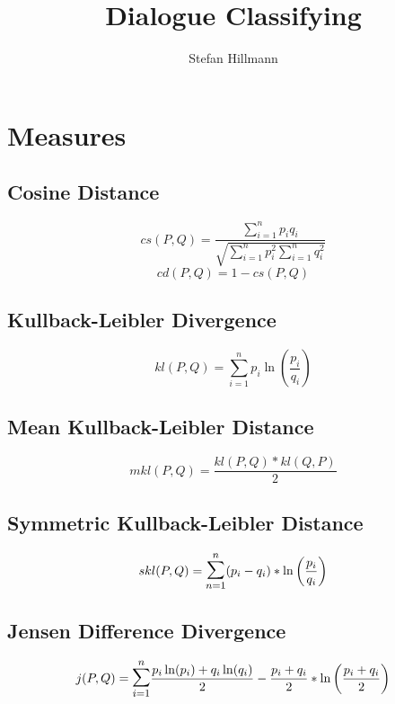 \documentclass[10pt,a4paper]{article}
\author{Stefan Hillmann}
\title{Dialogue Classifying}
\begin{document}
\maketitle

\section{Measures}
\subsection{Cosine Distance}
\begin{equation}
  cs(P,Q)=\frac{ \sum\limits_{i=1}^n p_i q_i }{ \sqrt{ \sum\limits_{i=1}^n p_i^2 \sum\limits_{i=1}^n q_i^2 } }
\end{equation}
\begin{equation}
  cd(P,Q) = 1-cs(P,Q)
\end{equation}

\subsection{Kullback-Leibler Divergence}
\begin{equation}
  kl(P, Q) = \sum\limits_{i=1}^n p_i \ln\left(\frac{p_i}{q_i}\right)
\end{equation}

\subsection{Mean Kullback-Leibler Distance}
\begin{equation}
  mkl(P, Q) = \frac{kl(P,Q)*kl(Q,P)}{2}
\end{equation}

\subsection{Symmetric Kullback-Leibler Distance}
\begin{equation}
  skl(P,Q) = \mathlarger{\mathlarger{\sum}}\limits_{n=1}^n (p_i-q_i) * \ln \left(\frac{p_i}{q_i}\right)
\end{equation}
\subsection{Jensen Difference Divergence}
\begin{equation}
  j(P,Q) = \mathlarger{\mathlarger{\sum}}\limits_{i=1}^n \frac{p_i \ln(p_i) + q_i \ln(q_i)}{2} - \frac{p_i+q_i}{2} * \ln\left( \frac{p_i+q_i}{2} \right)
\end{equation}
\end{document}

